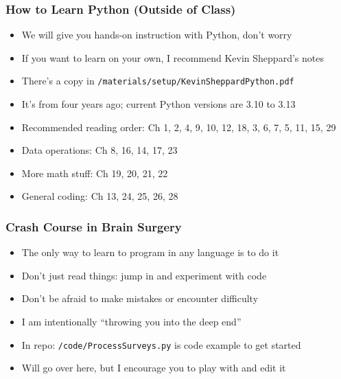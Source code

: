 \documentclass[aspectratio=169, handout]{beamer}
\begin{document}
\begin{frame}
\frametitle{How to Learn Python (Outside of Class)}
\begin{itemize}
\item We will give you hands-on instruction with Python, don't worry

\item If you want to learn on your own, I recommend Kevin Sheppard's notes

\item There's a copy in \texttt{/materials/setup/KevinSheppardPython.pdf}

\item It's from four years ago; current Python versions are 3.10 to 3.13

\item <2->Recommended reading order: Ch 1, 2, 4, 9, 10, 12, 18, 3, 6, 7, 5, 11, 15, 29

\item <2->Data operations: Ch 8, 16, 14, 17, 23

\item <2->More math stuff: Ch 19, 20, 21, 22

\item <2->General coding: Ch 13, 24, 25, 26, 28
\end{itemize}
\end{frame}


\begin{frame}
\frametitle{Crash Course in Brain Surgery}

\begin{itemize}
	\item The only way to learn to program in any language is to do it
	
	\item Don't just read things: jump in and experiment with code
	
	\item <2->Don't be afraid to make mistakes or encounter difficulty
	
	\item <2->I am intentionally ``throwing you into the deep end''
	
	\item <3->In repo: \texttt{/code/ProcessSurveys.py} is code example to get started
	
	\item <3->Will go over here, but I encourage you to play with and edit it
\end{itemize}
\end{frame}
\end{document}
